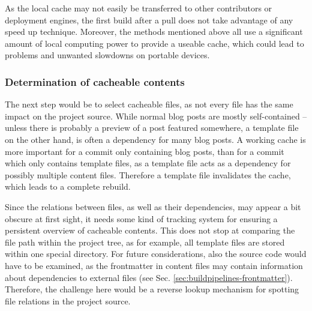 As the local cache may not easily be transferred to other contributors or deployment engines, the first build after a pull does not take advantage of any speed up technique. Moreover, the methods mentioned above all use a significant amount of local computing power to provide a useable cache, which could lead to problems and unwanted slowdowns on portable devices.

\subsubsection{Determination of cacheable contents}
\label{sec:challenges-cachedetermination}
The next step would be to select cacheable files, as not every file has the same impact on the project source. While normal blog posts are mostly self-contained --  unless there is probably a preview of a post featured somewhere, a template file on the other hand, is often a dependency for many blog posts. A working cache is more important for a commit only containing blog posts, than for a commit which only contains template files, as a template file acts as a dependency for possibly multiple content files. Therefore a template file invalidates the cache, which leads to a complete rebuild.

Since the relations between files, as well as their dependencies, may appear a bit obscure at first sight, it needs some kind of tracking system for ensuring a persistent overview of cacheable contents. This does not stop at comparing the file path within the project tree, as for example, all template files are stored within one special directory. For future considerations, also the source code would have to be examined, as the frontmatter in content files may contain information about dependencies to external files (see Sec. \ref{sec:buildpipelines-frontmatter}). Therefore, the challenge here would be a reverse lookup mechanism for spotting file relations in the project source.
